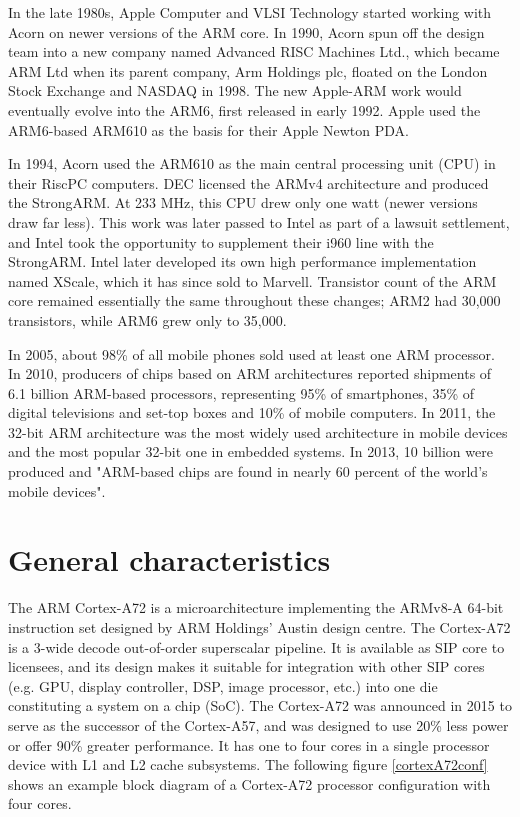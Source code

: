 \documentclass[12pt]{article}
\begin{document}
In the late 1980s, Apple Computer and VLSI Technology started working with Acorn on newer versions of the ARM core. In 1990, Acorn spun off the design team into a new company named Advanced RISC Machines Ltd., which became ARM Ltd when its parent company, Arm Holdings plc, floated on the London Stock Exchange and NASDAQ in 1998. The new Apple-ARM work would eventually evolve into the ARM6, first released in early 1992. Apple used the ARM6-based ARM610 as the basis for their Apple Newton PDA.\cite{wikipediaintro}\par

In 1994, Acorn used the ARM610 as the main central processing unit (CPU) in their RiscPC computers. DEC licensed the ARMv4 architecture and produced the StrongARM. At 233 MHz, this CPU drew only one watt (newer versions draw far less). This work was later passed to Intel as part of a lawsuit settlement, and Intel took the opportunity to supplement their i960 line with the StrongARM. Intel later developed its own high performance implementation named XScale, which it has since sold to Marvell. Transistor count of the ARM core remained essentially the same throughout these changes; ARM2 had 30,000 transistors, while ARM6 grew only to 35,000.\cite{wikipediaintro}\par

In 2005, about 98\% of all mobile phones sold used at least one ARM processor. In 2010, producers of chips based on ARM architectures reported shipments of 6.1 billion ARM-based processors, representing 95\% of smartphones, 35\% of digital televisions and set-top boxes and 10\% of mobile computers. In 2011, the 32-bit ARM architecture was the most widely used architecture in mobile devices and the most popular 32-bit one in embedded systems. In 2013, 10 billion were produced and "ARM-based chips are found in nearly 60 percent of the world’s mobile devices".\cite{wikipediaintro}\par



\section{General characteristics}
\hspace{\parindent} The ARM Cortex-A72 is a microarchitecture implementing the ARMv8-A 64-bit instruction set designed by ARM Holdings' Austin design centre. The Cortex-A72 is a 3-wide decode out-of-order superscalar pipeline. It is available as SIP core to licensees, and its design makes it suitable for integration with other SIP cores (e.g. GPU, display controller, DSP, image processor, etc.) into one die constituting a system on a chip (SoC). The Cortex-A72 was announced in 2015 to serve as the successor of the Cortex-A57, and was designed to use 20\% less power or offer 90\% greater performance. It has one to four cores in a single processor device with L1 and L2 cache subsystems.\cite{cortexA72manual} The following figure \ref{cortexA72conf} shows an example block diagram of a Cortex-A72 processor configuration with four cores.
\end{document}
